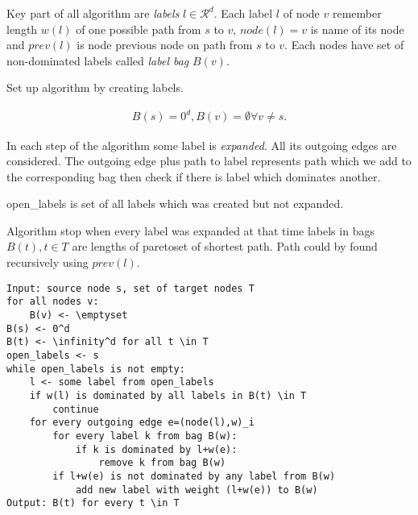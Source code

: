 Key part of all algorithm are \emph{labels} $l\in \mathcal{R}^d$.
Each label $l$ of node $v$ remember length $w(l)$  of one 
possible path from $s$ to $v$, $node(l) = v$ is name of its node
and $prev(l)$ is node previous node on path from $s$ to $v$.
Each nodes have set of non-dominated labels called \emph{label bag} $B(v)$.

Set up algorithm by creating labels.

\begin{gather*} 
B(s)=0^d, B(v)=\emptyset \forall v \ne s.
\end{gather*} 

In each step of the algorithm some label is \emph{expanded}. 
All its outgoing edges are considered. 
The outgoing edge plus path to label represents 
path which we add to the corresponding bag then check if there
is label which dominates another.

open\_labels is set of all labels which was created but not expanded.

Algorithm stop when every label was expanded at that time
labels in bags $B(t), t \in T$ are lengths of paretoset of shortest path.
Path could by found recursively using $prev(l)$.


\begin{lstlisting}[caption={Meta Search Algorithm},label=list:8-6,captionpos=t,float,abovecaptionskip=-\medskipamount]
Input: source node s, set of target nodes T
for all nodes v:
	B(v) <- \emptyset
B(s) <- 0^d
B(t) <- \infinity^d for all t \in T
open_labels <- s
while open_labels is not empty:
	l <- some label from open_labels
    if w(l) is dominated by all labels in B(t) \in T
    	continue
    for every outgoing edge e=(node(l),w)_i
    	for every label k from bag B(w):
        	if k is dominated by l+w(e):
            	remove k from bag B(w)
        if l+w(e) is not dominated by any label from B(w)
        	add new label with weight (l+w(e)) to B(w)
Output: B(t) for every t \in T
\end{lstlisting}
